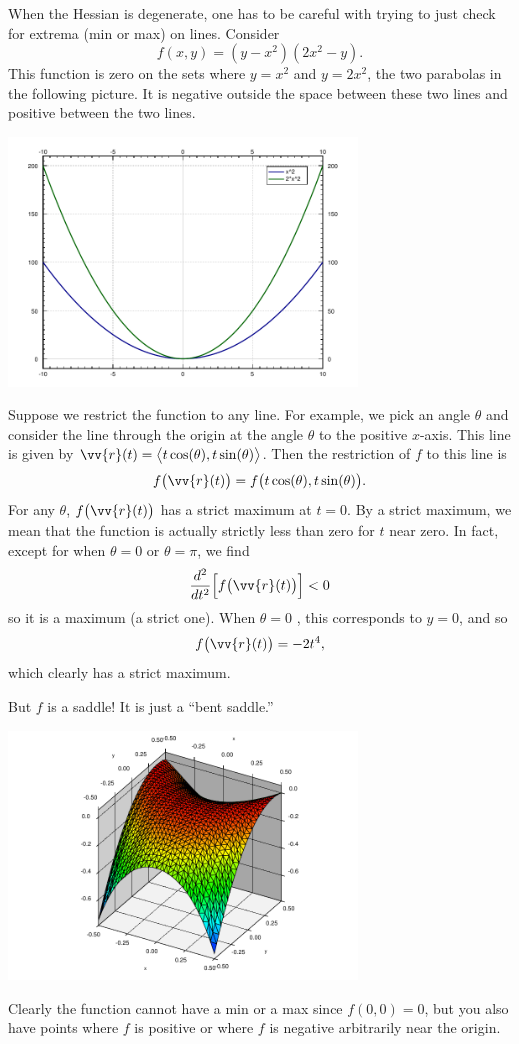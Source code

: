 \documentclass[12pt]{article}
\newcommand{\avoidbreak}{\postdisplaypenalty=100}
\begin{document}
When the Hessian is degenerate,
one has to be careful with trying to just check for extrema (min or max) on
lines.  Consider
\[
f(x,y) = (y-x^2)(2x^2-y) .
\]
This function is zero on the sets where $y=x^2$ and $y=2x^2$, the two
parabolas in the following picture.  It is negative outside the space
between these two lines and positive between the two lines.
\begin{center}
\includegraphics[width=3.65in]{peanocurves}
\end{center}
Suppose we restrict the function to any line. For example, we pick an angle
$\theta$ and consider the line through the origin at the angle
$\theta$ to the positive $x$-axis.
This line is given by $\vv{r}(t) = \bigl\langle t \cos(\theta),t
\sin(\theta)\bigr\rangle$.  Then the restriction of $f$ to this line is
\[
f\bigl(\vv{r}(t)\bigr) = f\bigl(t\cos(\theta),t\sin (\theta)\bigr) .
\]
For any $\theta$, $f\bigl(\vv{r}(t)\bigr)$ has a strict maximum at $t=0$.
By a strict maximum, we mean that the function is actually
strictly less than zero for $t$ near zero.
In fact, except for when $\theta=0$ or $\theta=\pi$, we find
\[
\frac{d^2}{dt^2} \Bigl[ f \bigl( \vv{r}(t) \bigr) \Bigr] < 0
\]
so it is a maximum (a strict one).  When $\theta = 0$ , this corresponds to
$y=0$, and so
\[
f \bigl( \vv{r}(t) \bigr) = -2t^4 ,
\avoidbreak
\]
which clearly has a strict maximum.

But $f$ is a saddle!  It is just a ``bent saddle.''
\begin{center}
\includegraphics[width=3.65in]{peanosurface}
\end{center}
Clearly the function cannot have a min or a max since $f(0,0)=0$, but you
also have points where $f$ is positive or where $f$ is negative arbitrarily
near the origin.
\end{document}
